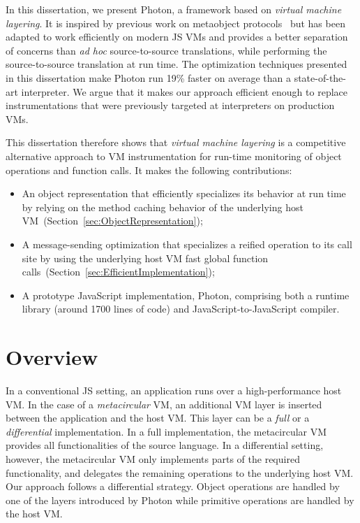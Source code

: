 In this dissertation, we present Photon, a framework based on \textit{virtual
machine layering}. It is inspired by previous work on metaobject
protocols~\cite{Kiczales:1991} but has been adapted to work efficiently on
modern JS VMs and provides a better separation of concerns than \textit{ad hoc}
source-to-source translations, while performing the source-to-source translation
at run time.  The optimization techniques presented in this dissertation make
Photon run 19\% faster on average  than a state-of-the-art interpreter. We
argue that it makes our approach efficient enough to replace instrumentations
that were previously targeted at interpreters on production VMs.

This dissertation therefore shows that \emph{virtual machine layering} is a
competitive alternative approach to VM instrumentation for run-time monitoring
of object operations and function calls. It makes the following contributions:
\begin{itemize}
    \item An object representation that efficiently specializes its behavior at
        run time by relying on the method caching behavior of the underlying host
        VM~(Section~\ref{sec:ObjectRepresentation});
    \item A message-sending optimization that specializes a reified operation
        to its call site by using the underlying host VM fast global function
        calls~(Section~\ref{sec:EfficientImplementation});
    \item A prototype JavaScript implementation, Photon, comprising both a runtime
        library (around 1700 lines of code) and JavaScript-to-JavaScript compiler.
\end{itemize}

\section{Overview}

In a conventional JS setting, an application runs over a high-performance host
VM. In the case of a \emph{metacircular} VM, an additional VM layer is
inserted between the application and the host VM. This layer can be a
\emph{full} or a \emph{differential} implementation. In a full implementation,
the metacircular VM provides all functionalities of the source language. In a
differential setting, however, the metacircular VM only implements parts of
the required functionality, and delegates the remaining operations to the
underlying host VM. Our approach follows a differential strategy.
Object
 operations are handled by one of the layers introduced by
Photon while primitive operations are handled by the host VM.

